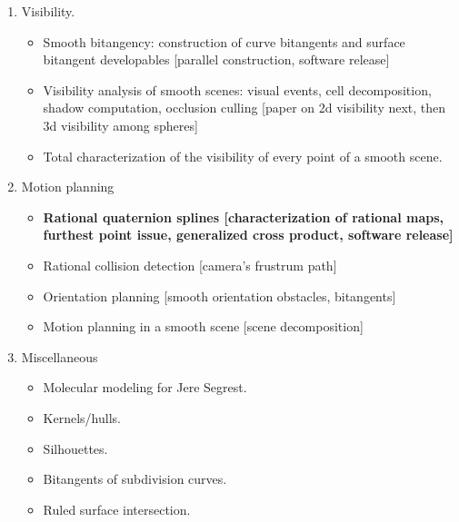 \documentclass[12pt]{article}
\begin{document}
\begin{enumerate}
\item Visibility.
\begin{itemize}
\item Smooth bitangency: construction of curve bitangents and 
      surface bitangent developables [parallel construction, software release]
\item Visibility analysis of smooth scenes: visual events, cell decomposition, 
      shadow computation, occlusion culling [paper on 2d visibility next, 
      then 3d visibility among spheres]
\item Total characterization of the visibility of every point of a smooth scene.
\end{itemize}
\item Motion planning
\begin{itemize}
\item {\bf Rational quaternion splines [characterization of rational maps, 
      furthest point issue, generalized cross product, software release]}
\item Rational collision detection [camera's frustrum path]
\item Orientation planning [smooth orientation obstacles, bitangents]
\item Motion planning in a smooth scene [scene decomposition]
\end{itemize}
\item Miscellaneous
\begin{itemize}
\item Molecular modeling for Jere Segrest.
\item Kernels/hulls.
\item Silhouettes.
\item Bitangents of subdivision curves.
\item Ruled surface intersection.
\end{itemize}
\end{enumerate}
\end{document}
